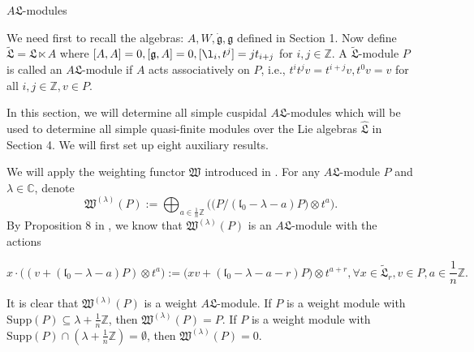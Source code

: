 \documentclass[1p]{elsarticle}
\numberwithin{equation}{section}
\def\dg{\dot{\mathfrak{g}}}
\def\fg{\mathfrak{g}}
\def\fL{\mathfrak{L}}
\def\Supp{\mathrm{Supp}}
\def\bC{\mathbb{C}}
\def\bN{\mathbb{N}}
\def\bZ{\mathbb{Z}}
\def\supp{\mathrm{supp}}
\def\tL{\widetilde{\fL}}
\def\fl{\mathfrak{l}}
\def\hL{\hat{\fL}}
\newtheorem{lemm}[theo]{Lemma}
\begin{document}





\begin{section}{$A\fL$-modules }\end{section}

We  need first to recall the   algebras: $A, W, \dg, \mathfrak{g}$ defined  in Section 1.
Now define  $\tL=\fL\ltimes A$ where $[A,A]=0, [\mathfrak{g}, A]=0, [\l_i, t^j]=jt_{i+j}$ for $i,j\in\bZ$. A $\tL$-module $P$ is called an $A\fL$-module  if $A$ acts associatively on $P$, i.e., $t^it^j v=t^{i+j}v,t^0 v=v$ for all $i,j\in \bZ, v\in P$.

In this section, we will determine all simple   cuspidal $A\fL$-modules which will be used to determine all simple quasi-finite modules over the Lie algebras $\hL$ in Section 4. We will first set up eight auxiliary results.



We will apply the weighting functor $\mathfrak{W}$ introduced in \cite{N2}. For any $A\fL$-module $P$ and  $\lambda\in\bC$, denote $$\mathfrak{W}^{(\lambda)}(P):=\bigoplus_{a\in\frac 1n \bZ}\Big(\big( P/ (\fl_0-\lambda-a)P\big)\otimes t^{a}\Big).$$
By Proposition 8 in \cite{N2}, we know that $\mathfrak{W}^{(\lambda)}(P)$ is an  $A\fL$-module with the actions

$$x\cdot\big((v+(\fl_0-\lambda-a)P)\otimes t^{a}\big):= \big(xv+(\fl_0-\lambda-a-r)P\big)\otimes t^{a+r},\forall x\in \tL_r,v\in P,a\in \frac 1n \bZ.$$

It is clear that $\mathfrak{W}^{(\lambda)}(P)$ is a weight   $A\fL$-module. If  $P$ is a weight module with $\Supp(P)\subseteq \lambda+\frac 1n \bZ$, then $\mathfrak{W}^{(\lambda)}(P)=P$. If  $P$ is a weight module with $\Supp(P)\cap (\lambda+\frac 1n \bZ)=\emptyset$, then $\mathfrak{W}^{(\lambda)}(P)=0$.
\end{document}
